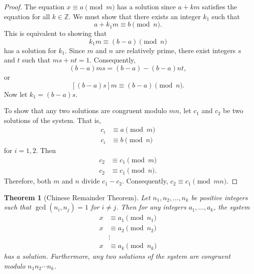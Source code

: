 \documentclass[12pt]{article}
\newtheorem{thm}{Theorem}[section]
\begin{document}
\begin{proof}
The equation $x \equiv a \pmod{m}$ has a solution since $a +km$
satisfies the equation for all $k \in {\mathbb Z}$.  We must show that
there exists an integer $k_1$ such that
\[
a + k_1 m \equiv b \pmod{n}.
\]
This is equivalent to showing that
\[
k_1 m \equiv (b-a) \pmod{n}
\]
has a solution for $k_1$.  Since $m$ and $n$ are relatively prime,
there exist integers $s$ and $t$ such that $ms + nt = 1$.
Consequently,
\[
(b-a) ms = (b-a) -(b-a) nt,
\]
or
\[
[(b-a)s]m \equiv (b-a) \pmod{n}.
\]
Now let $k_1 = (b-a)s$.


To show that any two solutions are congruent modulo $mn$, let $c_1$ and
$c_2$ be two solutions of  the system. That is,
\begin{align*}
c_i & \equiv  a \pmod{m} \\
c_i & \equiv  b \pmod{n}
\end{align*}
for $i = 1, 2$. Then
\begin{align*}
c_2 & \equiv  c_1 \pmod{m} \\
c_2 & \equiv  c_1 \pmod{n}.
\end{align*}
Therefore, both $m$ and $n$ divide $c_1 - c_2$. Consequently,
$c_2 \equiv c_1 \pmod{mn}$.
\mbox{\hspace*{1in}}
\end{proof}



\begin{thm}[Chinese Remainder Theorem]
Let $n_1, n_2, \ldots, n_k$ be positive integers such that $\gcd(n_i, n_j)
= 1$ for $i \neq j$. Then for any integers $a_1, \ldots, a_k$, the
system
\begin{align*}
x & \equiv  a_1 \pmod{n_1} \\
x & \equiv  a_2 \pmod{n_2} \\
 &  \vdots  \\
x & \equiv  a_k \pmod{n_k}
\end{align*}
has a solution.  Furthermore, any two solutions of the system are
congruent modulo $n_1 n_2 \cdots n_k$.
\end{thm}
\end{document}
